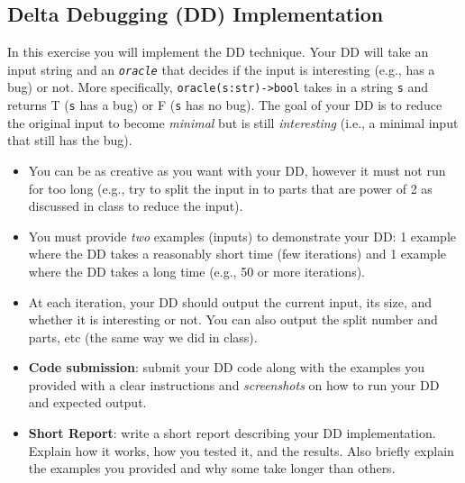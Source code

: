 \documentclass[oneside,11pt,dvipsnames]{book}
\newcommand{\code}[1]{\texttt{#1}}
\begin{document}
\subsection{Delta Debugging (DD) Implementation}
In this exercise you will implement the DD technique. Your DD will take an input string and an \emph \code{oracle} that decides if the input is interesting (e.g., has a bug) or not.
More specifically, \code{oracle(s:str)->bool} takes in a string \code{s} and returns T (\code{s} has a bug) or F (\code{s} has no bug).  The goal of your DD is to reduce the original input to become \emph{minimal} but is still \emph{interesting} (i.e., a minimal input that still has the bug).

\begin{itemize}
    \item You can be as creative as you want with your DD, however it must not run for too long (e.g., try to split the input in to parts that are power of 2 as discussed in class to reduce the input).
    \item You must provide \emph{two} examples (inputs) to demonstrate your DD:  1 example where the DD takes a reasonably short time (few iterations) and 1 example where the DD takes a long time (e.g., 50 or more iterations).  
    \item At each iteration, your DD should output the current input, its size, and whether it is interesting or not. You can also output the split number and parts, etc (the same way we did in class).
    \item \textbf{Code submission}: submit your DD code along with the examples you provided with a clear instructions and \emph{screenshots} on how to run your DD and expected output.
    \item \textbf{Short Report}: write a short report describing your DD implementation. Explain how it works, how you tested it, and the results. Also briefly explain the examples you provided and why some take longer than others.
\end{itemize}
\end{document}
